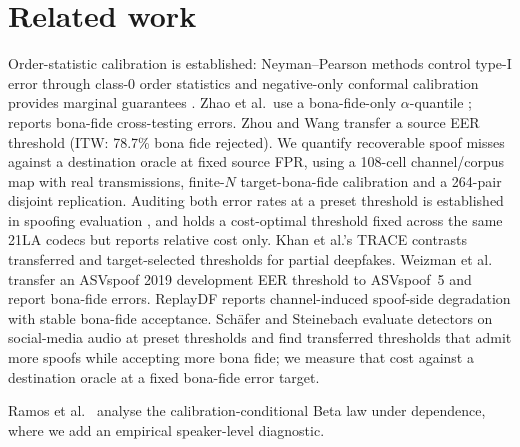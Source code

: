 \documentclass{article}
\begin{document}
\section{Related work}
\label{sec:related}
Order-statistic calibration is established: Neyman--Pearson methods control type-I error through class-0 order statistics \cite{tong18} and negative-only conformal calibration provides marginal guarantees \cite{vovk}. Zhao et al.\ use a bona-fide-only $\alpha$-quantile \cite{zhao26ca}; \cite{kwok25} reports bona-fide cross-testing errors. Zhou and Wang \cite{eerhides26} transfer a source EER threshold (ITW: 78.7\% bona fide rejected). We quantify recoverable spoof misses against a destination oracle at fixed source FPR, using a 108-cell channel/corpus map with real transmissions, finite-$N$ target-bona-fide calibration and a 264-pair disjoint replication. Auditing both error rates at a preset threshold is established in spoofing evaluation \cite{asvspoof5}, and \cite{rubio26} holds a cost-optimal threshold fixed across the same 21LA codecs but reports relative cost only. Khan et al.'s TRACE \cite{trace26} contrasts transferred and target-selected thresholds for partial deepfakes. Weizman et al.\ \cite{weizman25} transfer an ASVspoof 2019 development EER threshold to ASVspoof~5 and report bona-fide errors. ReplayDF \cite{muller25replay} reports channel-induced spoof-side degradation with stable bona-fide acceptance. Sch\"afer and Steinebach \cite{schaefer26} evaluate detectors on social-media audio at preset thresholds and find transferred thresholds that admit more spoofs while accepting more bona fide; we measure that cost against a destination oracle at a fixed bona-fide error target.



Ramos et al.\ \cite{ramos26} analyse the calibration-conditional Beta law under dependence, where we add an empirical speaker-level diagnostic. %
\end{document}
